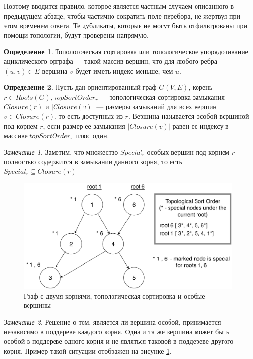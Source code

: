 \documentclass[12pt,a4paper,oneside,openany]{article}
\theoremstyle{definition}
\newtheorem{definition}{Определение}[]
\theoremstyle{lemma}
\theoremstyle{remark}
\newtheorem{remark}{Замечание}[]
\begin{document}
Поэтому вводится правило, которое является частным случаем описанного в предыдущем абзаце,
чтобы частично сократить поле перебора, не жертвуя при этом временем ответа.
Те дубликаты, которые не могут быть отфильтрованы при помощи топологии, будут проверены напрямую.

\begin{definition}
Топологоческая сортировка или топологическое упорядочивание ациклического орграфа --- такой массив вершин, что для любого ребра $(u,v) \in E$ вершина $v$ будет иметь индекс меньше, чем $u$.
\end{definition}

\begin{definition}\label{def:specialnode}
Пусть дан ориентированный граф $G(V,E)$, корень $r \in Roots(G)$, $topSortOrder_r$ ---
топологическая сортировка замыкания $Closure(r)$ и $|Closure(v)|$ ---
размеры замыканий для всех вершин $v \in Closure(r)$, то есть доступных из $r$.
Вершина называется особой вершиной под корнем $r$, если размер ее замыкания $|Closure(v)|$ равен ее индексу в массиве $topSortOrder_r$ плюс один.
\end{definition}

\begin{remark}
Заметим, что множество $Special_r$ особых вершин под корнем $r$ полностью содержится в замыкании данного корня, то есть $Special_r \subseteq Closure(r)$
\end{remark}

\begin{figure}[H]
      \centering
      \includegraphics[width=0.8\linewidth]{images/special_nodes.pdf}
      \caption{Граф с двумя корнями, топологическая сортировка и особые вершины}
      \label{fig:specialnodes}
\end{figure}

\begin{remark}
Решение о том, является ли вершина особой,
принимается независимо в поддереве каждого корня.
Одна и та же вершина может быть особой в поддереве одного корня
и не являться таковой в поддереве другого корня. Пример такой ситуации отображен на рисунке \ref{fig:specialnodes}.
\end{remark}
\end{document}
